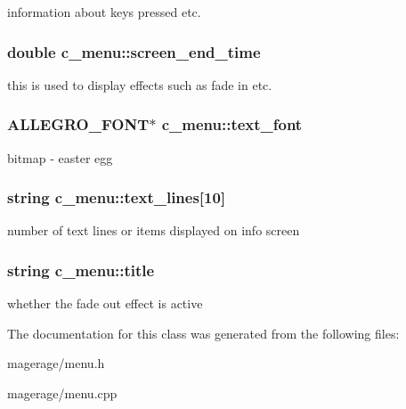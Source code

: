 information about keys pressed etc. \hypertarget{classc__menu_a55a8c30640f0cd40b1ac7db29644d050}{
\subsubsection[{screen\-\_\-end\-\_\-time}]{\setlength{\rightskip}{0pt plus 5cm}double c\-\_\-menu\-::screen\-\_\-end\-\_\-time\hspace{0.3cm}{\ttfamily [protected]}}}\label{classc__menu_a55a8c30640f0cd40b1ac7db29644d050}
this is used to display effects such as fade in etc. \hypertarget{classc__menu_a51aa6761c97638a2d3d3e34213a0fc25}{
\subsubsection[{text\-\_\-font}]{\setlength{\rightskip}{0pt plus 5cm}A\-L\-L\-E\-G\-R\-O\-\_\-\-F\-O\-N\-T$\ast$ c\-\_\-menu\-::text\-\_\-font\hspace{0.3cm}{\ttfamily [protected]}}}\label{classc__menu_a51aa6761c97638a2d3d3e34213a0fc25}
bitmap -\/ easter egg \hypertarget{classc__menu_ade57856309857147f055d82f1e7d839e}{
\subsubsection[{text\-\_\-lines}]{\setlength{\rightskip}{0pt plus 5cm}string c\-\_\-menu\-::text\-\_\-lines\mbox{[}10\mbox{]}\hspace{0.3cm}{\ttfamily [protected]}}}\label{classc__menu_ade57856309857147f055d82f1e7d839e}
number of text lines or items displayed on info screen \hypertarget{classc__menu_a04174390379e68ec20a0ec5945748570}{
\subsubsection[{title}]{\setlength{\rightskip}{0pt plus 5cm}string c\-\_\-menu\-::title\hspace{0.3cm}{\ttfamily [protected]}}}\label{classc__menu_a04174390379e68ec20a0ec5945748570}
whether the fade out effect is active 

The documentation for this class was generated from the following files\-:\begin{DoxyCompactItemize}
\item 
magerage/menu.\-h\item 
magerage/menu.\-cpp\end{DoxyCompactItemize}
